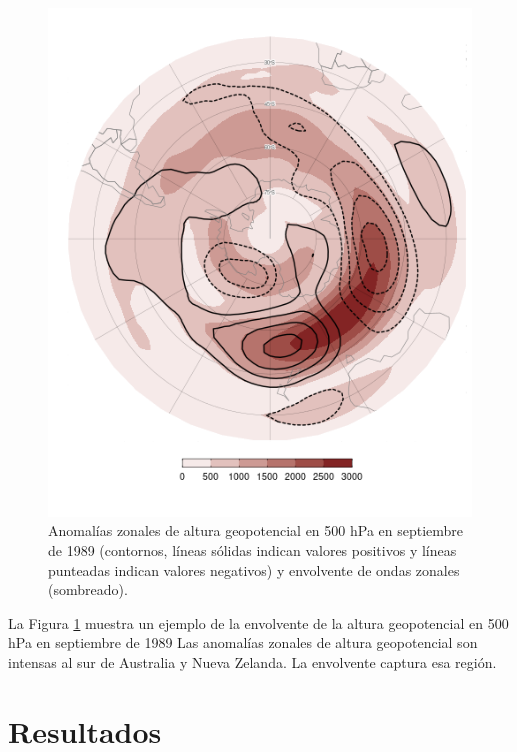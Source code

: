 \documentclass[12pt,oneside]{reedthesis}
\begin{document}
\begin{figure}
\includegraphics{figures/15-onda3/envolvente-ejemplo-1} \caption{Anomalías zonales de altura geopotencial en 500 hPa en septiembre de 1989 (contornos, líneas sólidas indican valores positivos y líneas punteadas indican valores negativos) y envolvente de ondas zonales (sombreado).}\label{fig:envolvente-ejemplo}
\end{figure}



La Figura \ref{fig:envolvente-ejemplo} muestra un ejemplo de la envolvente de la altura geopotencial en 500 hPa en septiembre de 1989
Las anomalías zonales de altura geopotencial son intensas al sur de Australia y Nueva Zelanda.
La envolvente captura esa región.

\hypertarget{resultados}{%
\section{Resultados}\label{resultados}}
\end{document}
